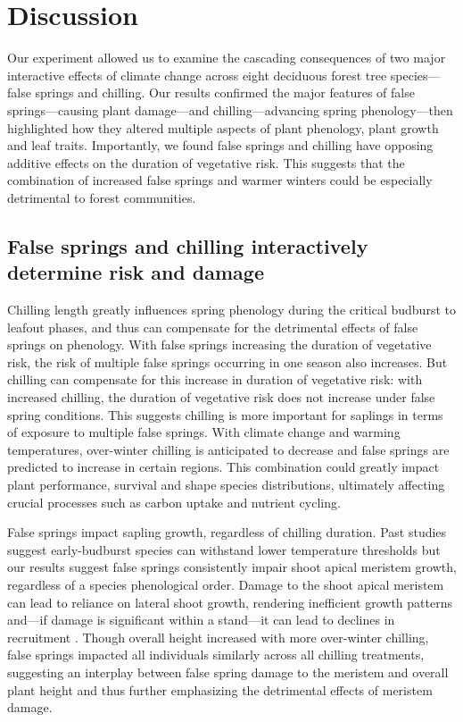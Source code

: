 \documentclass{article}\usepackage[]{graphicx}\usepackage[]{color}
\begin{document}
\section*{Discussion} 
Our experiment allowed us to examine the cascading consequences of two major interactive effects of climate change across eight deciduous forest tree species---false springs and chilling. Our results confirmed the major features of false springs---causing plant damage---and chilling---advancing spring phenology---then highlighted how they altered multiple aspects of plant phenology, plant growth and leaf traits. Importantly, we found false springs and chilling have opposing additive effects on the duration of vegetative risk. This suggests that the combination of increased false springs and warmer winters could be especially detrimental to forest communities. 

\subsection*{False springs and chilling interactively determine risk and damage}
Chilling length greatly influences spring phenology during the critical budburst to leafout phases, and thus can compensate for the detrimental effects of false springs on phenology. With false springs increasing the duration of vegetative risk, the risk of multiple false springs occurring in one season also increases. But chilling can compensate for this increase in duration of vegetative risk: with increased chilling, the duration of vegetative risk does not increase under false spring conditions. This suggests chilling is more important for saplings in terms of exposure to multiple false springs. With climate change and warming temperatures, over-winter chilling is anticipated to decrease and false springs are predicted to increase in certain regions. This combination could greatly impact plant performance, survival and shape species distributions, ultimately affecting crucial processes such as carbon uptake and nutrient cycling.
  
False springs impact sapling growth, regardless of chilling duration. Past studies suggest early-budburst species can withstand lower temperature thresholds \citep{Lenz2013, Muffler2016, Zohner2020} but our results suggest false springs consistently impair shoot apical meristem growth, regardless of a species phenological order. Damage to the shoot apical meristem can lead to reliance on lateral shoot growth, rendering inefficient growth patterns and---if damage is significant within a stand---it can lead to declines in recruitment \citep{Rhodes2018}. Though overall height increased with more over-winter chilling, false springs impacted all individuals similarly across all chilling treatments, suggesting an interplay between false spring damage to the meristem and overall plant height and thus further emphasizing the detrimental effects of meristem damage. 
  
\end{document}
